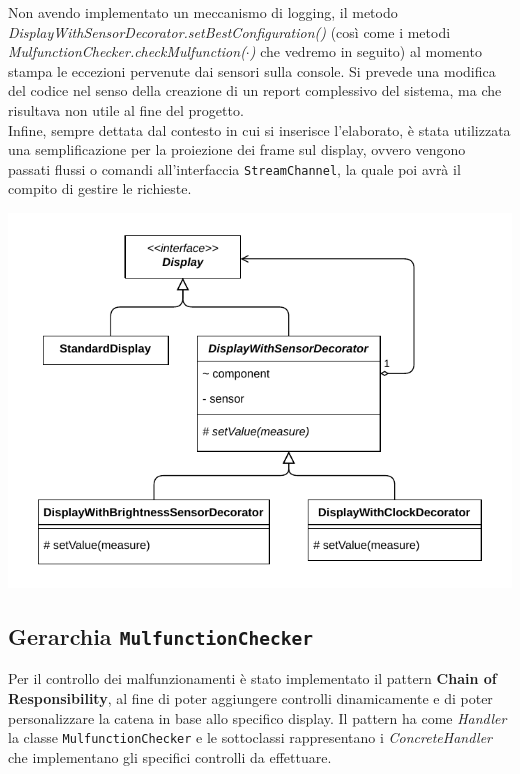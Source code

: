 \documentclass[a4paper,11pt]{article}
\begin{document}
	Non avendo implementato un meccanismo di logging, il metodo \textit{DisplayWithSensorDecorator.setBestConfiguration()} (così come i metodi \textit{MulfunctionChecker.checkMulfunction($\cdot$)} che vedremo in seguito) al momento stampa le eccezioni pervenute dai sensori sulla console. Si prevede una modifica del codice nel senso della creazione di un report complessivo del sistema, ma che risultava non utile al fine del progetto.\\
	Infine, sempre dettata dal contesto in cui si inserisce l'elaborato, è stata utilizzata una semplificazione per la proiezione dei frame sul display, ovvero vengono passati flussi o comandi all'interfaccia \texttt{StreamChannel}, la quale poi avrà il compito di gestire le richieste.\\
	\begin{minipage}[c]{.5\textwidth}
		\centering
		\includegraphics[width=\textwidth]{diagramma/ClassDiagramm-DisplayHierarchy.pdf}
		\label{fig:display}
	\end{minipage}
%		

	

	
	
	\subsection{Gerarchia \texttt{MulfunctionChecker}}
	Per il controllo dei malfunzionamenti è stato implementato il pattern \textbf{Chain of Responsibility}, al fine di poter aggiungere controlli dinamicamente e di poter personalizzare la catena in base allo specifico display. Il pattern ha come \textit{Handler} la classe \texttt{MulfunctionChecker} e le sottoclassi rappresentano i \textit{ConcreteHandler} che implementano gli specifici controlli da effettuare.\\
	
\end{document}
